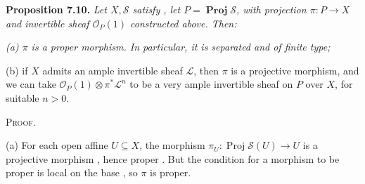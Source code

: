 {\medskip
\noindent\hypertarget{result-II-7.10}{}\textbf{Proposition 7.10.} \emph{Let $X,\mathcal S$ satisfy , let $P=\operatorname{\mathbf{Proj}}\mathcal S$, with projection $\pi\colon P\to X$ and invertible sheaf $\mathcal O_P(1)$ constructed above. Then:}
\par{\itshape\leftskip=12pt
\hypertarget{result-II-7.10a}{}(a) $\pi$ is a proper morphism. In particular, it is separated and of finite type;

\hypertarget{result-II-7.10b}{}(b) if $X$ admits an ample invertible sheaf $\mathcal L$, then $\pi$ is a projective morphism, and we can take $\mathcal O_P(1)\otimes\pi^*\mathcal L^n$ to be a very ample invertible sheaf on $P$ over $X$, for suitable $n>0$.\par}

\medskip
\noindent\textsc{Proof.}\par
(a) For each open affine $U\subseteq X$, the morphism $\pi_U\colon\operatorname{Proj}\mathcal S(U)\to U$ is a projective morphism , hence proper . But the condition for a morphism to be proper is local on the base , so $\pi$ is proper.
}
